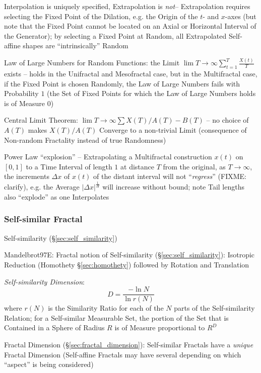 Interpolation is uniquely specified, Extrapolation is \emph{not}-- Extrapolation
requires selecting the Fixed Point of the Dilation, e.g. the Origin of the $t$-
and $x$-axes (but note that the Fixed Point cannot be located on an Axial or
Horizontal Interval of the Generator); by selecting a Fixed Point at Random, all
Extrapolated Self-affine shapes are ``intrinsically'' Random

Law of Large Numbers for Random Functions: the Limit
$\lim T \to \infty \sum_{t=1}^T \frac{X(t)}{T}$ exists -- holds in the
Unifractal and Mesofractal case, but in the Multifractal case, if the Fixed
Point is chosen Randomly, the Law of Large Numbers fails with Probability $1$
(the Set of Fixed Points for which the Law of Large Numbers holds is of Measure
$0$)

Central Limit Theorem: $\lim T \to \infty \sum X(T)/A(T) - B(T)$ -- no choice of
$A(T)$ makes $X(T)/A(T)$ Converge to a non-trivial Limit (consequence of
Non-random Fractality instead of true Randomness)

Power Law ``explosion'' -- Extrapolating a Multifractal construction $x(t)$ on
$[0, 1]$ to a Time Interval of length $1$ at distance $T$ from the original, as
$T \to \infty$, the increments $\Delta x$ of $x(t)$ of the distant interval will
not ``\emph{regress}'' (FIXME: clarify), e.g. the Average
$|\Delta x|^\frac{1}{H}$ will increase without bound; note Tail lengths also
``explode'' as one Interpolates



\subsubsection{Self-similar Fractal}\label{sec:selfsimilar_fractal}

Self-similarity (\S\ref{sec:self_similarity})

Mandelbrot97E: Fractal notion of Self-similarity (\S\ref{sec:self_similarity}):
Isotropic Reduction (Homothety \S\ref{sec:homothety}) followed by Rotation and
Translation

\emph{Self-similarity Dimension}:
\[
  D = \frac{-\ln N}{\ln r(N)}
\]
where $r(N)$ is the Similarity Ratio for each of the $N$ parts of the
Self-similarity Relation; for a Self-similar Measurable Set, the portion of the
Set that is Contained in a Sphere of Radius $R$ is of Measure proportional to
$R^D$

Fractal Dimension (\S\ref{sec:fractal_dimension}): Self-similar Fractals have a
\emph{unique} Fractal Dimension (Self-affine Fractals may have several depending
on which ``aspect'' is being considered)

